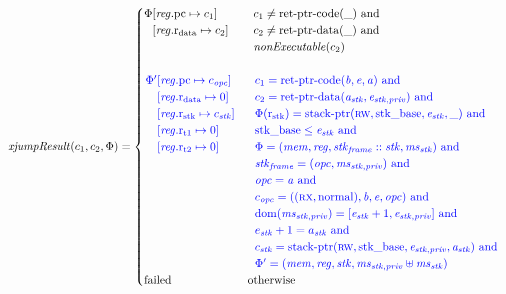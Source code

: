 \documentclass[a4paper]{article}
\begin{document}
\begin{align*}
  \xjumpResult{c_1}{c_2}{\Phi} = 
  \begin{cases}
    \arraycolsep=0pt
    \begin{array}[t]{rl}
      \Phi & \updReg{\pcreg}{c_1}\\
           & \updReg{\rdata}{c_2}
    \end{array} &
    \begin{array}[t]{l}
      c_1 \neq \retptrc(\_) \tand \\
      c_2 \neq \retptrd(\_) \tand \\
      \nonExec{c_2}
    \end{array}
    \\&\\
    \sourcecolor\left.
      \arraycolsep=0pt
      \begin{array}[t]{rl}
        \Phi' & \updReg{\pcreg}{c_\opc}\\
              & \updReg{\rdata}{0}\\
              & \updReg{\rstk}{c_\stk}\\
              & \updReg{\rtmp{1}}{0}\\
              & \updReg{\rtmp{2}}{0}
      \end{array}\right.&
    \sourcecolor\left.
      \begin{array}[t]{l}
        c_1 = \retptrc(\baddr,\eaddr,\aaddr) \tand \\
        c_2 = \retptrd(\aaddr_\stk,\eaddr_{\stk,\priv}) \tand \\
        \Phi(\rstk) = \stkptr{\rw,\stkb,\eaddr_\stk,\_} \tand \\
        \stkb \leq \eaddr_\stk \tand\\
        \Phi = (\mem,\reg,\stkf::\stk,\ms_\stk) \tand \\
        \stkf = (\opc,\ms_{\stk,\priv}) \tand \\
        \opc = \aaddr \tand \\
        c_\opc = ((\rx,\normal),\baddr,\eaddr,\opc) \tand \\
        \dom(\ms_{\stk,\priv}) = [\eaddr_\stk+1,\eaddr_{\stk,\priv}] \tand\\
        e_\stk + 1 = a_\stk \tand\\
        c_\stk = \stkptr{\rw,\stkb,\eaddr_{\stk,\priv},\aaddr_\stk} \tand\\
        \Phi' = (\mem,\reg,\stk,\ms_{\stk,\priv} \uplus \ms_\stk) 
      \end{array}\right.
    \\
    \failed & \totherwise
  \end{cases}
\end{align*}
\end{document}
